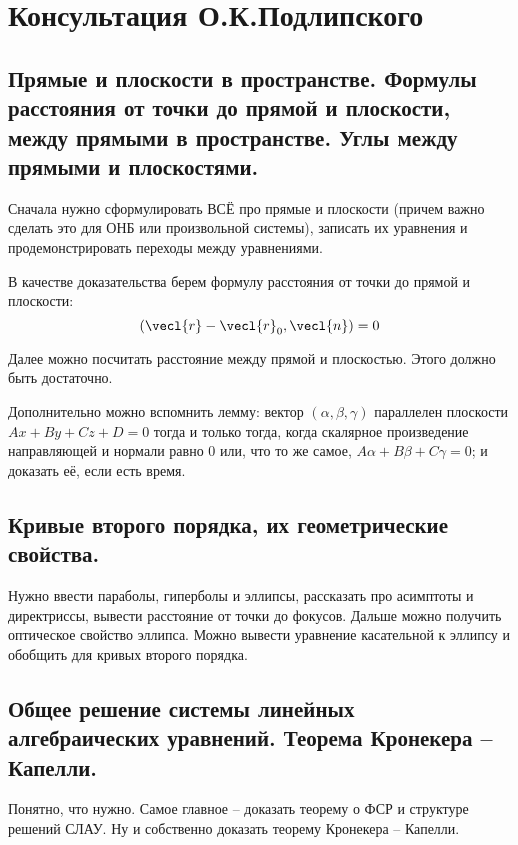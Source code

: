 \newpage
\section{Консультация О.К.Подлипского}

\subsection{Прямые и плоскости в пространстве. Формулы расстояния от точки до прямой и плоскости, между прямыми в пространстве. Углы между прямыми и плоскостями.}

Сначала нужно сформулировать ВСЁ про прямые и плоскости (причем важно сделать это для ОНБ или произвольной системы), записать их уравнения и продемонстрировать переходы между уравнениями.

В качестве доказательства берем формулу расстояния от точки до прямой и плоскости:
\begin{equation*}
    (\vecl{r} - \vecl{r}_0, \vecl{n}) = 0
\end{equation*}

Далее можно посчитать расстояние между прямой и плоскостью. Этого должно быть достаточно.

Дополнительно можно вспомнить лемму: вектор $(\alpha, \beta, \gamma)$ параллелен плоскости $Ax + By + Cz + D = 0$ тогда и только тогда, когда скалярное произведение направляющей и нормали равно 0 или, что то же самое, $A\alpha + B\beta + C\gamma = 0$; и доказать её, если есть время.

\subsection{Кривые второго порядка, их геометрические свойства.}

Нужно ввести параболы, гиперболы и эллипсы, рассказать про асимптоты и директриссы, вывести расстояние от точки до фокусов. Дальше можно получить оптическое свойство эллипса. Можно вывести уравнение касательной к эллипсу и обобщить для кривых второго порядка.

\subsection{Общее решение системы линейных алгебраических уравнений. Теорема Кронекера -- Капелли.}

Понятно, что нужно. Самое главное -- доказать теорему о ФСР и структуре решений СЛАУ. Ну и собственно доказать теорему Кронекера -- Капелли. 

